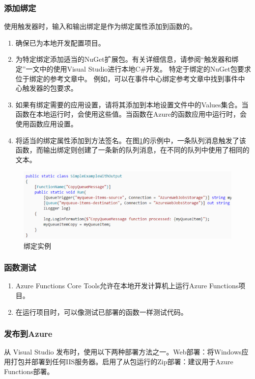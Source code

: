 \documentclass[11pt]{article}
\begin{document}
\subsubsection{添加绑定}
使用触发器时，输入和输出绑定是作为绑定属性添加到函数的。
\begin{enumerate}
	\item 确保已为本地开发配置项目。
	\item 为特定绑定添加适当的NuGet扩展包。有关详细信息，请参阅“触发器和绑定”一文中的使用Visual Studio进行本地C\#开发。 特定于绑定的NuGet包要求位于绑定的参考文章中。 例如，可以在事件中心绑定参考文章中找到事件中心触发器的包要求。
	\item 如果有绑定需要的应用设置，请将其添加到本地设置文件中的Values集合。当函数在本地运行时，会使用这些值。当函数在Azure的函数应用中运行时，会使用函数应用设置。
	\item 将适当的绑定属性添加到方法签名。在图\ref{fig7}的示例中，一条队列消息触发了该函数，而输出绑定则创建了一条新的队列消息，在不同的队列中使用了相同的文本。
\end{enumerate}	
\begin{figure}[h]	
	\centering
	\includegraphics[scale=0.6]{figs/7.png}        %
	\caption{绑定实例}
	\label{fig7}	
\end{figure}

\subsubsection{函数测试}
\begin{enumerate}
	\item Azure Functions Core Tools允许在本地开发计算机上运行Azure Functions项目。
	\item 在运行项目时，可以像测试已部署的函数一样测试代码。
\end{enumerate}	

\subsubsection{发布到Azure}
从 Visual Studio 发布时，使用以下两种部署方法之一。Web部署：将Windows应用打包并部署到任何IIS服务器。启用了从包运行的Zip部署：建议用于Azure Functions部署。
\end{document}

